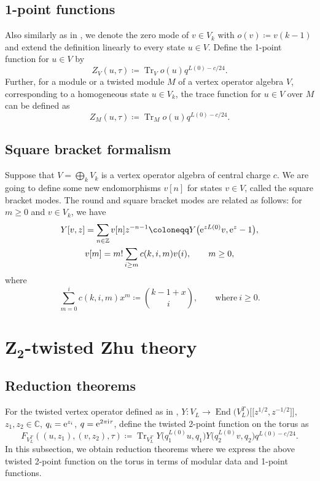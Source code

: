 \documentclass[pdftex]{sigma}
\numberwithin{equation}{section}
\theoremstyle{definition}
\begin{document}
\subsection{1-point functions}

Also similarly as in \cite{Mason20231-PointAlgebras}, we denote the zero mode of $v\in V_{k}$ with $o(v)\coloneqq v(k-1)$ and extend the definition linearly to every state $u\in V$. Define the 1-point function for $u\in V$ by
\[Z_V(u,\tau)\coloneqq \operatorname{Tr}_Vo(u)q^{L(0)-c/24}.\]
Further, for a module or a twisted module $M$ of a vertex operator algebra $V$, corresponding to a homogeneous state $u\in V_k$, the trace function for $u\in V$ over $M$ can be defined as
\[Z_M(u,\tau)\coloneqq \operatorname{Tr}_Mo(u)q^{L(0)-c/24}.\]

\subsection{Square bracket formalism}

Suppose that $V=\bigoplus_k V_k$ is a vertex operator algebra of central charge $c$. We are going to define some new endomorphisms $v[n]$ for states $v\in V$, called the square bracket modes. The round and square bracket modes are related as follows: for $m\geq 0$ and $v\in V_k$, we have
\begin{gather*}
Y[v,z]=\sum_{n\in \mathbb{Z}}v[n]z^{-n-1}\coloneqq Y\bigl({\rm e}^{zL(0)}v,{\rm e}^z-1\bigr),\\
v[m]=m!\sum_{i\geq m}c(k,i,m)v(i), \qquad m\geq 0,
\end{gather*}
where
\begin{equation}\label{square bracket relations}
 \sum_{m=0}^i c(k,i,m)x^m \coloneqq {k-1+x\choose i}, \qquad \text{where} \ i\geq 0.
\end{equation}

\section[Z\_2-twisted Zhu theory]{$\boldsymbol{Z_2}$-twisted Zhu theory}\label{sec3}

\subsection{Reduction theorems}\label{section3.1}

For the twisted vertex operator defined as in \cite{Frenkel1988VertexMonster},
$
Y \colon V_L\to \operatorname{End}\bigl(V_L^T\bigr)\big[\big[z^{1/2},z^{-1/2}\big]\big]$,
 $z_1,z_2\in \mathbb{C}$, $q_i={\rm e}^{z_i}$, $q={\rm e}^{2\pi{\rm i}\tau}$, define the twisted 2-point function on the torus as
\[F_{V_L^T}((u,z_1),(v,z_2),\tau)\coloneqq \operatorname{Tr}_{V_L^T}Y\bigl(q_1^{L(0)}u,q_1\bigr)Y\bigl(q_2^{L(0)}v,q_2\bigr)q^{L(0)-c/24}.\]
In this subsection, we obtain reduction theorems where we express the above twisted 2-point function on the torus in terms of modular data and 1-point functions.
\end{document}
